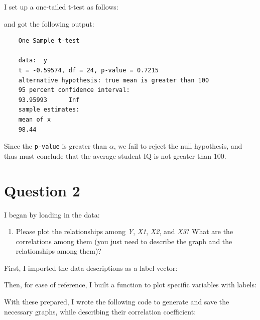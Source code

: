 \documentclass[12pt,letterpaper]{article}
\begin{document}
I set up a one-tailed t-test as follows: 

  

\noindent and got the following output:

\begin{verbatim}
	One Sample t-test

	data:  y
	t = -0.59574, df = 24, p-value = 0.7215
	alternative hypothesis: true mean is greater than 100
	95 percent confidence interval:
	93.95993      Inf
	sample estimates:
	mean of x 
	98.44 
\end{verbatim}

Since the \texttt{p-value} is greater than $\alpha$, we fail to reject the null hypothesis, and thus must conclude that the average student IQ is not greater than 100.

\vspace{.5cm}

\section*{Question 2}

\vspace{.25cm}

I began by loading in the data:

  

\vspace{.5cm}

\begin{enumerate} 
	\item Please plot the relationships among \emph{Y}, \emph{X1}, \emph{X2}, and \emph{X3}? What are the correlations among them (you just need to describe the graph and the relationships among them)?
\end{enumerate}

First, I imported the data descriptions as a label vector:

 

Then, for ease of reference, I built a function to plot specific variables with labels:

 
 
With these prepared, I wrote the following code to generate and save the necessary graphs, while describing their correlation coefficient:
\end{document}

